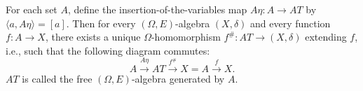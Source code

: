 For each set $A$, define the insertion-of-the-variables map $A\eta: A \longrightarrow AT$ by $\langle a, A\eta \rangle = [a]$. Then for every $(\Omega, E)$-algebra $(X, \delta)$ and every function $f: A \longrightarrow X$, there exists a unique $\Omega$-homomorphism $f^{\#}: AT \longrightarrow (X, \delta)$ extending $f$, i.e., such that the following diagram commutes:
$$
A \xrightarrow{A\eta} AT \xrightarrow{f^{\#}} X = A \xrightarrow{f} X.
$$
$AT$ is called the free $(\Omega, E)$-algebra generated by $A$.
